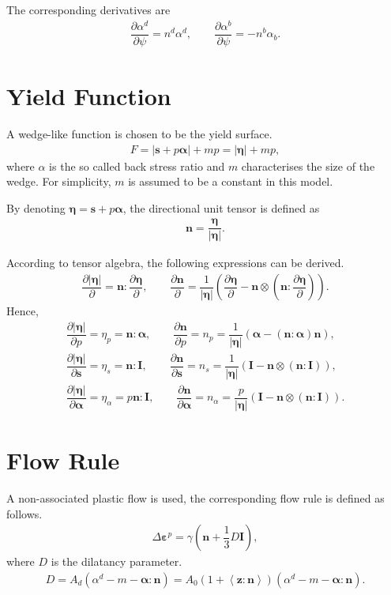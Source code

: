 \documentclass[11pt,a4paper]{article}
\newcommand*{\pfrac}[2]{\dfrac{\partial#1}{\partial#2}}
\begin{document}
The corresponding derivatives are
\begin{gather}
\pfrac{\alpha^d}{\psi}=n^d\alpha^d,\qquad\pfrac{\alpha^b}{\psi}=-n^b\alpha_b.
\end{gather}
\section{Yield Function}
A wedge-like function is chosen to be the yield surface.
\begin{gather}
F=\big|\mathbold{s}+p\mathbold{\alpha}\big|+mp=\big|\mathbold{\eta}\big|+mp,
\end{gather}
where $\alpha$ is the so called back stress ratio and $m$ characterises the size of the wedge. For simplicity, $m$ is assumed to be a constant in this model.

By denoting $\mathbold{\eta}=\mathbold{s}+p\mathbold{\alpha}$, the directional unit tensor is defined as
\begin{gather}
\mathbold{n}=\dfrac{\mathbold{\eta}}{\big|\mathbold{\eta}\big|}.
\end{gather}

According to tensor algebra, the following expressions can be derived.
\begin{gather*}
\pfrac{|\mathbold{\eta}|}{}=\mathbold{n}:\pfrac{\mathbold{\eta}}{},\qquad
\pfrac{\mathbold{n}}{}=\dfrac{1}{|\mathbold{\eta}|}\left(\pfrac{\mathbold{\eta}}{}-\mathbold{n}\otimes\left(\mathbold{n}:\pfrac{\mathbold{\eta}}{}\right)\right).
\end{gather*}
Hence,
\begin{gather*}
\pfrac{|\mathbold{\eta}|}{p}=\eta_p=\mathbold{n}:\mathbold{\alpha},\qquad
\pfrac{\mathbold{n}}{p}=n_p=\dfrac{1}{|\mathbold{\eta}|}\left(\mathbold{\alpha}-\left(\mathbold{n}:\mathbold{\alpha}\right)\mathbold{n}\right),\\
\pfrac{|\mathbold{\eta}|}{\mathbold{s}}=\eta_s=\mathbold{n}:\mathbf{I},\qquad
\pfrac{\mathbold{n}}{\mathbold{s}}=n_s=\dfrac{1}{|\mathbold{\eta}|}\left(\mathbf{I}-\mathbold{n}\otimes\left(\mathbold{n}:\mathbf{I}\right)\right),\\
\pfrac{|\mathbold{\eta}|}{\mathbold{\alpha}}=\eta_\alpha=p\mathbold{n}:\mathbf{I},\qquad
\pfrac{\mathbold{n}}{\mathbold{\alpha}}=n_\alpha=\dfrac{p}{|\mathbold{\eta}|}\left(\mathbf{I}-\mathbold{n}\otimes\left(\mathbold{n}:\mathbf{I}\right)\right).
\end{gather*}

\section{Flow Rule}
A non-associated plastic flow is used, the corresponding flow rule is defined as follows.
\begin{gather}
\Delta\mathbold{\varepsilon}^p=\gamma\left(\mathbold{n}+\dfrac{1}{3}D\mathbold{I}\right),
\end{gather}
where $D$ is the dilatancy parameter.
\begin{gather}
D=A_d\left(\alpha^d-m-\mathbold{\alpha}:\mathbold{n}\right)=A_0\left(1+\left\langle\mathbold{z}:\mathbold{n}\right\rangle\right)\left(\alpha^d-m-\mathbold{\alpha}:\mathbold{n}\right).
\end{gather}
\end{document}
